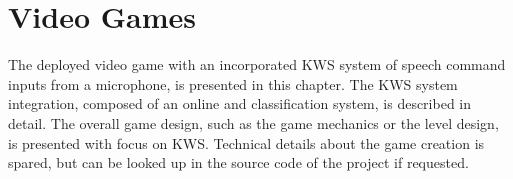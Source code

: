 
\chapter{Video Games}\label{sec:game}
The deployed video game with an incorporated KWS system of speech command inputs from a microphone, is presented in this chapter.
The KWS system integration, composed of an online and classification system, is described in detail.
The overall game design, such as the game mechanics or the level design, is presented with focus on KWS.
Technical details about the game creation is spared, but can be looked up in the source code of the project \cite{KWSGame} if requested.



